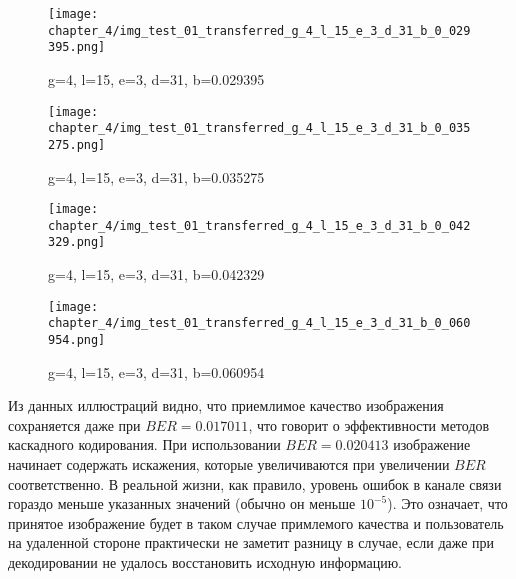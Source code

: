 \begin{figure}[h]
\begin{center}
\begin{minipage}[h]{0.4\linewidth}
\texttt{[image: chapter\_4/img\_test\_01\_transferred\_g\_4\_l\_15\_e\_3\_d\_31\_b\_0\_029395.png]}
\caption{g=4, l=15, e=3, d=31, b=0.029395}
\label{img:experimcoded9}
\end{minipage}
\hfill 
\begin{minipage}[h]{0.4\linewidth}
\texttt{[image: chapter\_4/img\_test\_01\_transferred\_g\_4\_l\_15\_e\_3\_d\_31\_b\_0\_035275.png]}
\caption{g=4, l=15, e=3, d=31, b=0.035275}
\label{img:experimcoded10}
\end{minipage}
\end{center}

\begin{center}
\begin{minipage}[h]{0.4\linewidth}
\texttt{[image: chapter\_4/img\_test\_01\_transferred\_g\_4\_l\_15\_e\_3\_d\_31\_b\_0\_042329.png]}
\caption{g=4, l=15, e=3, d=31, b=0.042329}
\label{img:experimcoded11}
\end{minipage}
\hfill 
\begin{minipage}[h]{0.4\linewidth}
\texttt{[image: chapter\_4/img\_test\_01\_transferred\_g\_4\_l\_15\_e\_3\_d\_31\_b\_0\_060954.png]}
\caption{g=4, l=15, e=3, d=31, b=0.060954}
\label{img:experimcoded12}
\end{minipage}
\end{center}
\end{figure}

Из данных иллюстраций видно, что приемлимое качество изображения сохраняется даже при $BER=0.017011$, что говорит
о эффективности методов каскадного кодирования. При использовании $BER=0.020413$ изображение начинает содержать
искажения, которые увеличиваются при увеличении $BER$ соответственно. В реальной жизни, как правило, уровень ошибок в канале связи
гораздо меньше указанных значений (обычно он меньше $10^{-5}$). Это означает, что принятое изображение будет в таком случае примлемого
качества и пользователь на удаленной стороне практически не заметит разницу в случае, если даже при декодировании не удалось
восстановить исходную информацию.

